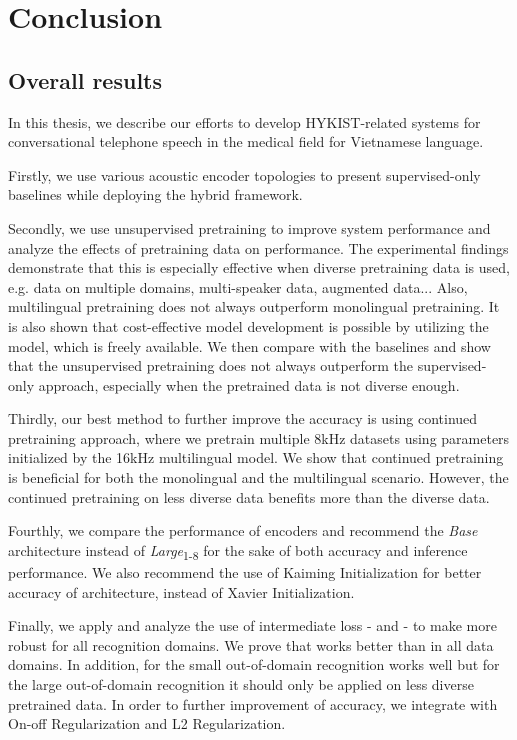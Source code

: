 \chapter{Conclusion}
\label{ch: Conclusion}


\section{Overall results}

In this thesis, we describe our efforts to develop HYKIST-related  systems for conversational telephone speech in the medical field for Vietnamese language.

Firstly, we use various acoustic encoder topologies to present supervised-only baselines while deploying the hybrid  framework.

Secondly, we use unsupervised  pretraining to improve system performance and analyze the effects of pretraining data on performance.
The experimental findings demonstrate that this is especially effective when diverse pretraining data is used, e.g. data on multiple domains, multi-speaker data, augmented data...
Also, multilingual pretraining does not always outperform monolingual pretraining.
It is also shown that cost-effective model development is possible by utilizing the  model, which is freely available.
We then compare with the baselines and show that the  unsupervised pretraining does not always outperform the  supervised-only approach, especially when the pretrained data is not diverse enough.

Thirdly, our best method to further improve the accuracy is using continued pretraining approach, where we pretrain multiple 8kHz datasets using parameters initialized by the 16kHz multilingual  model.
We show that continued pretraining is beneficial for both the monolingual and the multilingual scenario.
However, the continued pretraining on less diverse data benefits more than the diverse data.

Fourthly, we compare the performance of  encoders and recommend the \textit{Base} architecture instead of \textit{Large}\textsubscript{1-8} for the sake of both accuracy and inference performance.
We also recommend the use of Kaiming Initialization for better accuracy of  architecture, instead of Xavier Initialization.

Finally, we apply and analyze the use of intermediate loss -  and  - to make  more robust for all recognition domains.
We prove that  works better than  in all data domains.
In addition, for the small out-of-domain recognition  works well but for the large out-of-domain recognition it should only be applied on less diverse pretrained data.
In order to further improvement of accuracy, we integrate  with On-off Regularization and L2 Regularization.


